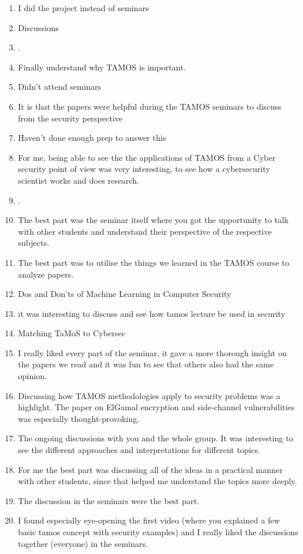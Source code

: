 \documentclass[a4paper]{report}
\begin{document}
\begin{enumerate}
  \item I did the project instead of seminars
  \item Discussions
  \item .
  \item Finally understand why TAMOS is important.
  \item Didn't attend seminars
  \item It is that the papers were helpful during the TAMOS seminars to discuss from the security perspective
  \item Haven't done enough prep to answer this
  \item For me, being able to see the the applications of TAMOS from a Cyber security point of view was very interesting, to see how a cybersecurity scientist works and does research.
  \item .
  \item The best part was the seminar itself where you got the upportunity to talk with other students and understand their perspective of the respective subjects. 
  \item The best part was to utilise the things we learned in the TAMOS course to analyze papers. 
  \item Dos and Don'ts of Machine Learning in Computer Security 
  \item it was interesting to discuss and see how tamos lecture be used in security 
  \item Matching TaMoS to Cybersec
  \item I really liked every part of the seminar, it gave a more thorough insight on the papers we read and it was fun to see that others also had the same opinion.
  \item Discussing how TAMOS methodologies apply to security problems was a highlight. The paper on ElGamal encryption and side-channel vulnerabilities was especially thought-provoking.
  \item The ongoing discussions with you and the whole group. It was interesting to see the different approaches and interpretations for different topics.
  \item For me the best part was discussing all of the ideas in a practical manner with other students, since that helped me understand the topics more deeply.
  \item The discussion in the seminars were the best part. 
  \item I found especially eye-opening the first video (where you explained a few basic tamos concept with security examples) and I really liked the discussions together (everyone) in the seminars.

\end{enumerate}
\end{document}
